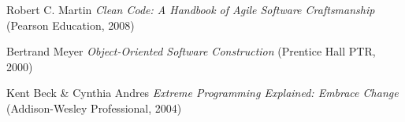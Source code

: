 \begin{thebibliography}{unsrt}

    Robert C. Martin \emph{Clean Code: A Handbook of Agile Software Craftsmanship} (Pearson Education, 2008)

    Bertrand Meyer \emph{Object-Oriented Software Construction } (Prentice Hall PTR, 2000)

    Kent Beck \& Cynthia Andres \emph{Extreme Programming Explained: Embrace Change} (Addison-Wesley Professional, 2004)

\end{thebibliography}

\renewcommand{\lstlistlistingname}{Code examples}
\lstlistoflistings
